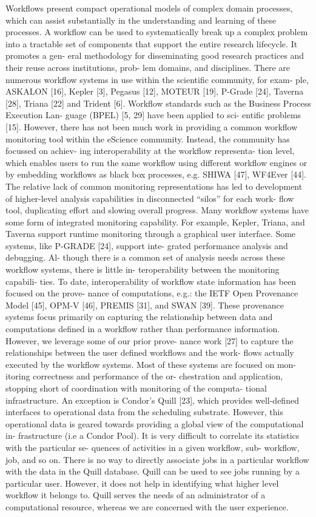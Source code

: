 \documentclass[final,5p,times,twocolumn]{elsarticle}
\begin{document}
Workflows present compact operational models of complex domain processes, which can assist substantially in the understanding and learning of these processes. A workflow can be used to systematically break up a complex problem into a tractable set of components that support the entire research lifecycle. It promotes a gen- eral methodology for disseminating good research practices and their reuse across institutions, prob- lem domains, and disciplines.
There are numerous workflow systems in use within the scientific community, for exam- ple, ASKALON [16], Kepler [3], Pegasus [12], MOTEUR [19], P-Grade [24], Taverna [28], Triana [22] and Trident [6]. Workflow standards such as the Business Process Execution Lan- guage (BPEL) [5, 29] have been applied to sci- entific problems [15]. However, there has not been much work in providing a common workflow monitoring tool within the eScience community. Instead, the community has focussed on achiev- ing interoperability at the workflow representa- tion level, which enables users to run the same workflow using different workflow engines or by embedding workflows as black box processes, e.g. SHIWA [47], WF4Ever [44]. The relative lack of common monitoring representations has led to development of higher-level analysis capabilities in disconnected “silos” for each work- flow tool, duplicating effort and slowing overall progress.
Many workflow systems have some form of integrated monitoring capability. For example, Kepler, Triana, and Taverna support runtime monitoring through a graphical user interface. Some systems, like P-GRADE [24], support inte- grated performance analysis and debugging. Al- though there is a common set of analysis needs across these workflow systems, there is little in- teroperability between the monitoring capabili- ties. To date, interoperability of workflow state information has been focused on the prove- nance of computations, e.g.: the IETF Open Provenance Model [45], OPM-V [46], PREMIS [31], and SWAN [39]. These provenance systems focus primarily on capturing the relationship between data and computations defined in a workflow rather than performance information. However, we leverage some of our prior prove- nance work [27] to capture the relationships between the user defined workflows and the work- flows actually executed by the workflow systems.
Most of these systems are focused on mon- itoring correctness and performance of the or- chestration and application, stopping short of coordination with monitoring of the computa- tional infrastructure. An exception is Condor’s Quill [23], which provides well-defined interfaces to operational data from the scheduling substrate. However, this operational data is geared towards providing a global view of the computational in- frastructure (i.e a Condor Pool). It is very difficult to correlate its statistics with the particular se- quences of activities in a given workflow, sub- workflow, job, and so on. There is no way to directly associate jobs in a particular workflow with the data in the Quill database. Quill can be used to see jobs running by a particular user. However, it does not help in identifying what higher level workflow it belongs to. Quill serves the needs of an administrator of a computational resource, whereas we are concerned with the user experience.
\end{document}
